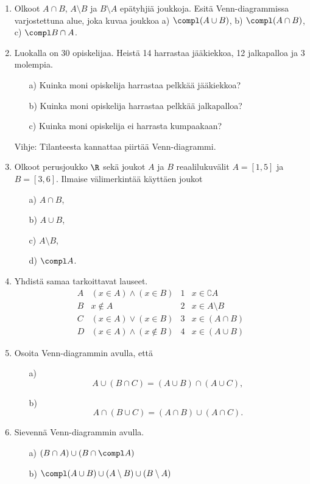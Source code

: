 \begin{enumerate}
\item
Olkoot $A \cap B$, $A \setminus B$ ja $B \setminus A$ epätyhjiä joukkoja. Esitä Venn-diagrammissa varjostettuna alue, joka kuvaa joukkoa a) $\compl (A \cup B)$, b) $\compl (A \cap B)$, c) $\compl B \cap A$.

\item Luokalla on 30 opiskelijaa. Heistä 14 harrastaa jääkiekkoa, 12 jalkapalloa ja 3 molempia. 
\begin{itemize}
\item[a)] Kuinka moni opiskelija harrastaa pelkkää jääkiekkoa?
\item[b)] Kuinka moni opiskelija harrastaa pelkkää jalkapalloa?
\item[c)] Kuinka moni opiskelija ei harrasta kumpaakaan?
\end{itemize}
Vihje: Tilanteesta kannattaa piirtää Venn-diagrammi.

\item Olkoot perusjoukko $\R$ sekä joukot $A$ ja $B$ reaalilukuvälit $A=[1,5]$ ja $B=[3,6]$. Ilmaise välimerkintää käyttäen joukot
\begin{itemize}
\item[a)] $A \cap B$,
\item[b)] $A \cup B$,
\item[c)] $A \setminus B$,
\item[d)] $\compl A$.
\end{itemize}

\item Yhdistä samaa tarkoittavat lauseet.
\[
\begin{array}{llll}
A & (x\in A)\land (x\in B) & 1 & x\in \complement A \\
B & x\notin A & 2 & x \in A\setminus B \\
C & (x\in A)\lor (x\in B) & 3 & x\in (A\cap B) \\
D & (x\in A)\land (x\notin B) & 4 & x\in (A\cup B)
\end{array}
\]

\item Osoita Venn-diagrammin avulla, että
\begin{itemize}
\item[a)] 
\[
A\cup (B \cap C) = (A\cup B)\cap(A\cup C),
\]
\item[b)] 
\[
A\cap (B \cup C) = (A\cap B)\cup(A\cap C).
\]
\end{itemize}

\item Sievennä Venn-diagrammin avulla.
\begin{itemize}
\item[a)] $(B\cap A) \cup (B \cap \compl A)$
\item[b)] $\compl (A\cup B) \cup (A \setminus B) \cup (B \setminus A)$
\end{itemize}


\end{enumerate}
